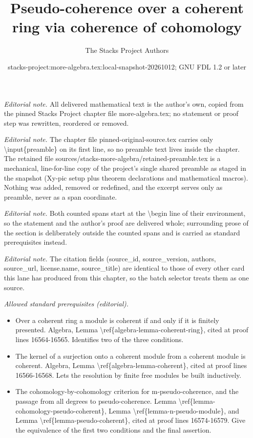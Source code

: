 \documentclass[10pt,a4paper]{amsart}
\title{Pseudo-coherence over a coherent ring via coherence of cohomology}
\author{The Stacks Project Authors}
\date{stacks-project:more-algebra.tex:local-snapshot-20261012; GNU FDL 1.2 or later}
\theoremstyle{plain}
\theoremstyle{definition}
\theoremstyle{remark}
\numberwithin{equation}{subsection}
\begin{document}
\maketitle
\setcounter{subsection}{1}
\noindent\textit{Editorial note.} All delivered mathematical text is the author's own, copied from the pinned Stacks Project chapter file more-algebra.tex; no statement or proof step was rewritten, reordered or removed.\par\medskip
\noindent\textit{Editorial note.} The chapter file pinned-original-source.tex carries only \textbackslash{}input\{preamble\} on its first line, so no preamble text lives inside the chapter. The retained file sources/stacks-more-algebra/retained-preamble.tex is a mechanical, line-for-line copy of the project's single shared preamble as staged in the snapshot (Xy-pic setup plus theorem declarations and mathematical macros). Nothing was added, removed or redefined, and the excerpt serves only as preamble, never as a span coordinate.\par\medskip
\noindent\textit{Editorial note.} Both counted spans start at the \textbackslash{}begin line of their environment, so the statement and the author's proof are delivered whole; surrounding prose of the section is deliberately outside the counted spans and is carried as standard prerequisites instead.\par\medskip
\noindent\textit{Editorial note.} The citation fields (source\_id, source\_version, authors, source\_url, license.name, source\_title) are identical to those of every other card this lane has produced from this chapter, so the batch selector treats them as one source.\par\medskip
\noindent\textit{Allowed standard prerequisites (editorial).}\begin{itemize}
\item Over a coherent ring a module is coherent if and only if it is finitely presented. Algebra, Lemma \textbackslash{}ref\{algebra-lemma-coherent-ring\}, cited at proof lines 16564-16565. Identifies two of the three conditions.
\item The kernel of a surjection onto a coherent module from a coherent module is coherent. Algebra, Lemma \textbackslash{}ref\{algebra-lemma-coherent\}, cited at proof lines 16566-16568. Lets the resolution by finite free modules be built inductively.
\item The cohomology-by-cohomology criterion for m-pseudo-coherence, and the passage from all degrees to pseudo-coherence. Lemma \textbackslash{}ref\{lemma-cohomology-pseudo-coherent\}, Lemma \textbackslash{}ref\{lemma-n-pseudo-module\}, and Lemma \textbackslash{}ref\{lemma-pseudo-coherent\}, cited at proof lines 16574-16579. Give the equivalence of the first two conditions and the final assertion.
\end{itemize}\medskip
\end{document}
